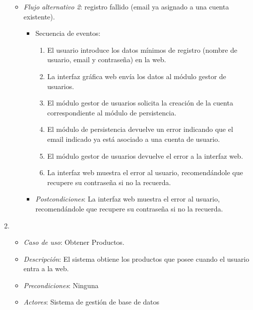 \begin{enumerate}[{\bf UC-1}]
\begin{itemize}

  \item {\it Flujo alternativo 2}: registro fallido (email ya asignado a una cuenta existente).
\begin{itemize}
\item Secuencia de eventos:

    \begin{enumerate}[1. ]
    \item El usuario introduce los datos mínimos de registro (nombre de usuario, email y contraseña) en la web.
    \item La interfaz gráfica web envía los datos al módulo gestor de usuarios.
    \item El módulo gestor de usuarios solicita la creación de la cuenta correspondiente al módulo de persistencia.
    \item El módulo de persistencia devuelve un error indicando que el email indicado ya está asociado a una cuenta de usuario.
    \item El módulo gestor de usuarios devuelve el error a la interfaz web.
    \item La interfaz web muestra el error al usuario, recomendándole que recupere su contraseña si no la recuerda.
    \end{enumerate}
  \item {\it Postcondiciones}: La interfaz web muestra el error al usuario, recomendándole que recupere su contraseña si no la recuerda. 
\end{itemize}


  \end{itemize}

\item 
  \begin{itemize}
  \item {\it Caso de uso}: Obtener Productos.
  \item {\it Descripción}: El sistema obtiene los productos que posee cuando el usuario entra a la web.
  \item {\it Precondiciones}: Ninguna
  \item {\it Actores}: Sistema de gestión de base de datos



\end{itemize}
\end{enumerate}
